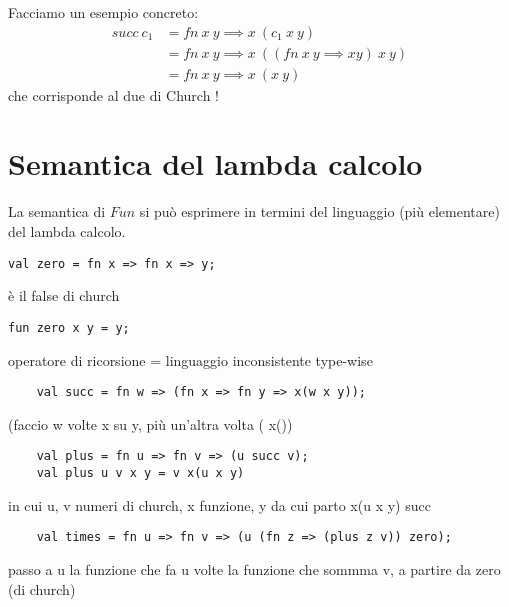 \documentclass[a4paper,11pt]{report}
\begin{document}
Facciamo un esempio concreto:
\begin{align*}
    succ \ c_1 &= fn \ x \ y \implies x \ (c_1 \ x \ y) \\
               & = fn \ x \ y \implies x \ (( fn \ x \ y \implies xy) \ x \ y ) \\
               & = fn \ x \ y \implies x \ ( x \ y)
\end{align*}
che corrisponde al due di Church !


\section{Semantica del lambda calcolo}
La semantica di \( Fun \) si può esprimere in termini del linguaggio (più elementare) del lambda calcolo.


\begin{lstlisting}
val zero = fn x => fn x => y;
\end{lstlisting}
è il false di church


\begin{lstlisting}
fun zero x y = y;
\end{lstlisting}

operatore di ricorsione = linguaggio inconsistente type-wise

\begin{lstlisting}
    val succ = fn w => (fn x => fn y => x(w x y));
\end{lstlisting}
(faccio w volte x su y, più un'altra volta ( x())

\begin{lstlisting}
    val plus = fn u => fn v => (u succ v);
    val plus u v x y = v x(u x y)
\end{lstlisting}
in cui u, v numeri di church, x funzione, y da cui parto
x(u x y) succ

\begin{lstlisting}
    val times = fn u => fn v => (u (fn z => (plus z v)) zero);
\end{lstlisting}
passo a u la funzione che fa u volte la funzione che sommma v, a partire da zero (di church)
\end{document}
